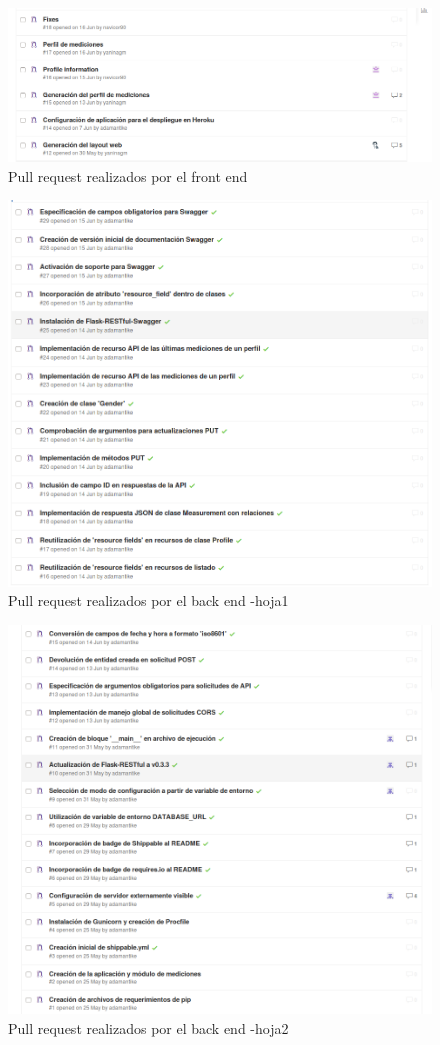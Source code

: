 \documentclass[a4paper,12pt]{article}
\begin{document}
\begin{figure}[h]
  \centering
  \includegraphics[width=.8\textwidth]{img/2-PR}
  \caption{Pull request realizados por el front end}
  \label{2-PR}
\end{figure}
\begin{figure}[h]
  \centering
  \includegraphics[width=.8\textwidth]{img/2-PR_back2}
  \caption{Pull request realizados por el back end -hoja1}
  \label{2-PR_back2}
\end{figure}
\begin{figure}[h]
  \centering
  \includegraphics[width=.8\textwidth]{img/2-PR_Back}
  \caption{Pull request realizados por el back end -hoja2}
  \label{2-PR_Back}
\end{figure}
\end{document}
